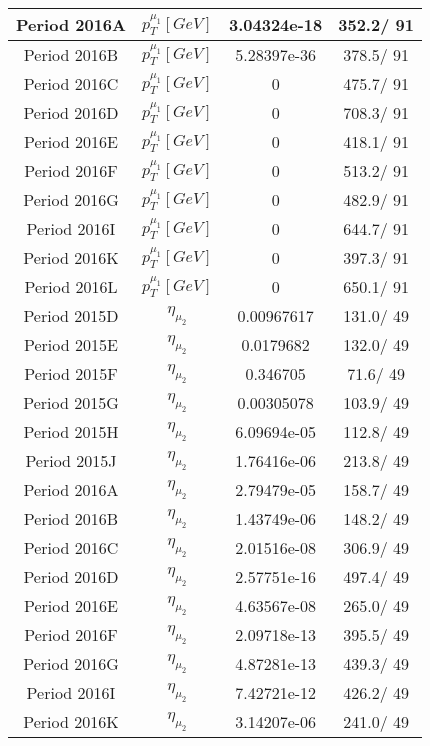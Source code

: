 \documentclass{article}
\begin{document}
\begin{longtable}{c|c|c|c}
\hline
 Period 2016A & $p_{T}^{\mu_{1}} [GeV]$ & 3.04324e-18 & 352.2/ 91\\
\hline
 Period 2016B & $p_{T}^{\mu_{1}} [GeV]$ & 5.28397e-36 & 378.5/ 91\\
\hline
 Period 2016C & $p_{T}^{\mu_{1}} [GeV]$ & 0 & 475.7/ 91\\
\hline
 Period 2016D & $p_{T}^{\mu_{1}} [GeV]$ & 0 & 708.3/ 91\\
\hline
 Period 2016E & $p_{T}^{\mu_{1}} [GeV]$ & 0 & 418.1/ 91\\
\hline
 Period 2016F & $p_{T}^{\mu_{1}} [GeV]$ & 0 & 513.2/ 91\\
\hline
 Period 2016G & $p_{T}^{\mu_{1}} [GeV]$ & 0 & 482.9/ 91\\
\hline
 Period 2016I & $p_{T}^{\mu_{1}} [GeV]$ & 0 & 644.7/ 91\\
\hline
 Period 2016K & $p_{T}^{\mu_{1}} [GeV]$ & 0 & 397.3/ 91\\
\hline
 Period 2016L & $p_{T}^{\mu_{1}} [GeV]$ & 0 & 650.1/ 91\\
\hline
 Period 2015D & $\eta_{\mu_{2}}$ & 0.00967617 & 131.0/ 49\\
\hline
 Period 2015E & $\eta_{\mu_{2}}$ & 0.0179682 & 132.0/ 49\\
\hline
 Period 2015F & $\eta_{\mu_{2}}$ & 0.346705 &  71.6/ 49\\
\hline
 Period 2015G & $\eta_{\mu_{2}}$ & 0.00305078 & 103.9/ 49\\
\hline
 Period 2015H & $\eta_{\mu_{2}}$ & 6.09694e-05 & 112.8/ 49\\
\hline
 Period 2015J & $\eta_{\mu_{2}}$ & 1.76416e-06 & 213.8/ 49\\
\hline
 Period 2016A & $\eta_{\mu_{2}}$ & 2.79479e-05 & 158.7/ 49\\
\hline
 Period 2016B & $\eta_{\mu_{2}}$ & 1.43749e-06 & 148.2/ 49\\
\hline
 Period 2016C & $\eta_{\mu_{2}}$ & 2.01516e-08 & 306.9/ 49\\
\hline
 Period 2016D & $\eta_{\mu_{2}}$ & 2.57751e-16 & 497.4/ 49\\
\hline
 Period 2016E & $\eta_{\mu_{2}}$ & 4.63567e-08 & 265.0/ 49\\
\hline
 Period 2016F & $\eta_{\mu_{2}}$ & 2.09718e-13 & 395.5/ 49\\
\hline
 Period 2016G & $\eta_{\mu_{2}}$ & 4.87281e-13 & 439.3/ 49\\
\hline
 Period 2016I & $\eta_{\mu_{2}}$ & 7.42721e-12 & 426.2/ 49\\
\hline
 Period 2016K & $\eta_{\mu_{2}}$ & 3.14207e-06 & 241.0/ 49\\

\end{longtable}
\end{document}
